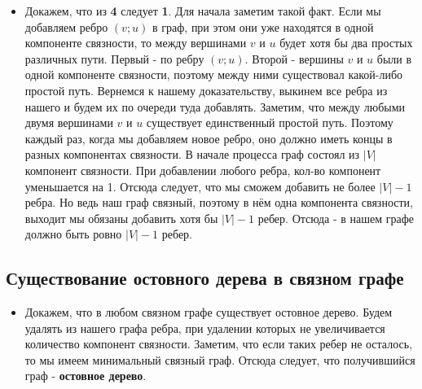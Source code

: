 \documentclass{article}
\begin{document}
\begin{itemize}
\begin{itemize}
        \item 
        Докажем, что из \textbf{4} следует \textbf{1}. Для начала заметим такой факт. Если мы добавляем ребро $(v; u)$ в граф, при этом они уже находятся в одной компоненте связности, то между вершинами $v$ и $u$ будет хотя бы два простых различных пути. Первый - по ребру $(v; u)$. Второй - вершины $v$ и $u$ были в одной компоненте связности, поэтому между ними существовал какой-либо простой путь. Вернемся к нашему доказательству, выкинем все ребра из нашего и будем их по очереди туда добавлять. Заметим, что между любыми двумя вершинами $v$ и $u$ существует единственный простой путь. Поэтому каждый раз, когда мы добавляем новое ребро, оно должно иметь концы в разных компонентах связности. В начале процесса граф состоял из $|V|$ компонент связности. При добавлении любого ребра, кол-во компонент уменьшается на 1. Отсюда следует, что мы сможем добавить не более $|V| - 1$ ребра. Но ведь наш граф связный, поэтому в нём одна компонента связности, выходит мы обязаны добавить хотя бы $|V| - 1$ ребер. Отсюда - в нашем графе должно быть ровно $|V| - 1$ ребер.
        \end{itemize}
    \end{itemize}

    \subsection{Существование остовного дерева в связном графе}
    \begin{itemize}
        \item Докажем, что в любом связном графе существует остовное дерево. Будем удалять из нашего графа ребра, при удалении которых не увеличивается количество компонент связности. Заметим, что если таких ребер не осталось, то мы имеем минимальный связный граф. Отсюда следует, что получившийся граф - \textbf{остовное дерево}.
    \end{itemize}
\end{document}
